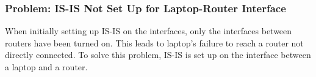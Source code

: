 \subsubsection{Problem: IS-IS Not Set Up for Laptop-Router Interface}
When initially setting up IS-IS on the interfaces, only the interfaces between routers have been turned on. This leads to laptop's failure to reach a router not directly connected.
To solve this problem, IS-IS is set up on the interface between a laptop and a router.

\clearpage



